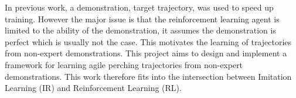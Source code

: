 In previous work, a demonstration, target trajectory, was used to speed up training.
However the major issue is that the reinforcement learning agent is limited to the ability of the demonstration, it assumes the demonstration is perfect which is usually not the case.
This motivates the learning of trajectories from non-expert demonstrations.
This project aims to design and implement a framework for learning agile perching trajectories from non-expert demonstrations.
This work therefore fits into the intersection between Imitation Learning (IR) and Reinforcement Learning (RL).